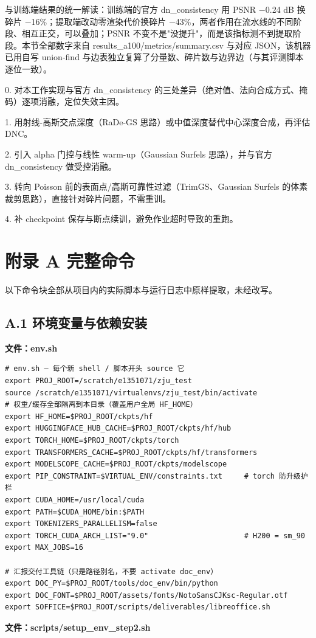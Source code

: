 \documentclass[UTF8,a4paper,11pt]{ctexart}
\begin{document}
与训练端结果的统一解读：训练端的官方 dn\_consistency 用 PSNR $-$0.24 dB 换碎片 $-$16\%；提取端改动零渲染代价换碎片 $-$43\%，两者作用在流水线的不同阶段、相互正交，可以叠加；PSNR 不变不是"没提升"，而是该指标测不到提取阶段。本节全部数字来自 results\_a100/metrics/summary.csv 与对应 JSON，该机器已用自写 union-find 与边表独立复算了分量数、碎片数与边界边（与其评测脚本逐位一致）。

0. 对本工作实现与官方 dn\_consistency 的三处差异（绝对值、法向合成方式、掩码）逐项消融，定位失效主因。

1. 用射线-高斯交点深度（RaDe-GS 思路）或中值深度替代中心深度合成，再评估 DNC。

2. 引入 alpha 门控与线性 warm-up（Gaussian Surfels 思路），并与官方 dn\_consistency 做受控消融。

3. 转向 Poisson 前的表面点/高斯可靠性过滤（TrimGS、Gaussian Surfels 的体素裁剪思路），直接针对碎片问题，不需重训。

4. 补 checkpoint 保存与断点续训，避免作业超时导致的重跑。

\section{附录 A  完整命令}
以下命令块全部从项目内的实际脚本与运行日志中原样提取，未经改写。

\subsection{A.1 环境变量与依赖安装}
\textbf{文件：env.sh}

{\small
\begin{verbatim}
# env.sh — 每个新 shell / 脚本开头 source 它
export PROJ_ROOT=/scratch/e1351071/zju_test
source /scratch/e1351071/virtualenvs/zju_test/bin/activate
# 权重/缓存全部隔离到本目录（覆盖用户全局 HF_HOME）
export HF_HOME=$PROJ_ROOT/ckpts/hf
export HUGGINGFACE_HUB_CACHE=$PROJ_ROOT/ckpts/hf/hub
export TORCH_HOME=$PROJ_ROOT/ckpts/torch
export TRANSFORMERS_CACHE=$PROJ_ROOT/ckpts/hf/transformers
export MODELSCOPE_CACHE=$PROJ_ROOT/ckpts/modelscope
export PIP_CONSTRAINT=$VIRTUAL_ENV/constraints.txt     # torch 防升级护栏
export CUDA_HOME=/usr/local/cuda
export PATH=$CUDA_HOME/bin:$PATH
export TOKENIZERS_PARALLELISM=false
export TORCH_CUDA_ARCH_LIST="9.0"                      # H200 = sm_90
export MAX_JOBS=16

# 汇报交付工具链（只是路径别名，不要 activate doc_env）
export DOC_PY=$PROJ_ROOT/tools/doc_env/bin/python
export DOC_FONT=$PROJ_ROOT/assets/fonts/NotoSansCJKsc-Regular.otf
export SOFFICE=$PROJ_ROOT/scripts/deliverables/libreoffice.sh
\end{verbatim}
}
\textbf{文件：scripts/setup\_env\_step2.sh}
\end{document}

